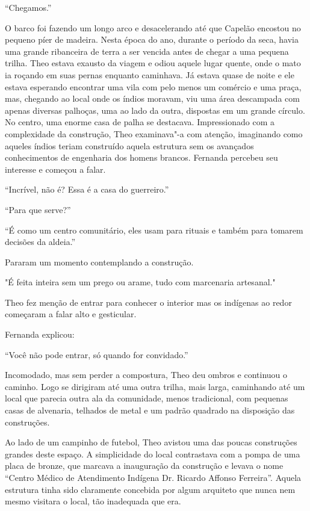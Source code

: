 \asterisc


``Chegamos.''

O barco foi fazendo um longo arco e desacelerando até que Capelão
encostou no pequeno píer de madeira. Nesta época do ano, durante o
período da seca, havia uma grande ribanceira de terra a ser vencida
antes de chegar a uma pequena trilha. Theo estava exausto da viagem e
odiou aquele lugar quente, onde o mato ia roçando em suas pernas
enquanto caminhava. Já estava quase de noite e ele estava esperando
encontrar uma vila com pelo menos um comércio e uma praça, mas, chegando
ao local onde os índios moravam, viu uma área descampada com apenas
diversas palhoças, uma ao lado da outra, dispostas em um grande círculo.
No centro, uma enorme casa de palha se destacava. Impressionado com a
complexidade da construção, Theo examinava"-a com atenção, imaginando
como aqueles índios teriam construído aquela estrutura sem os avançados
conhecimentos de engenharia dos homens brancos. Fernanda percebeu seu
interesse e começou a falar.

``Incrível, não é? Essa é a casa do guerreiro.''

``Para que serve?''

``É como um centro comunitário, eles usam para rituais e também para
tomarem decisões da aldeia.''

Pararam um momento contemplando a construção.

"É feita inteira sem um prego ou arame, tudo com marcenaria artesanal."

Theo fez menção de entrar para conhecer o interior mas os indígenas ao
redor começaram a falar alto e gesticular.

Fernanda explicou:

``Você não pode entrar, só quando for convidado.''

Incomodado, mas sem perder a compostura, Theo deu ombros e continuou o
caminho. Logo se dirigiram até uma outra trilha, mais larga, caminhando
até um local que parecia outra ala da comunidade, menos tradicional, com
pequenas casas de alvenaria, telhados de metal e um padrão quadrado na
disposição das construções.

Ao lado de um campinho de futebol, Theo avistou uma das poucas
construções grandes deste espaço. A simplicidade do local contrastava
com a pompa de uma placa de bronze, que marcava a inauguração da
construção e levava o nome ``Centro Médico de Atendimento Indígena Dr.
Ricardo Affonso Ferreira''. Aquela estrutura tinha sido claramente
concebida por algum arquiteto que nunca nem mesmo visitara o local, tão
inadequada que era.

